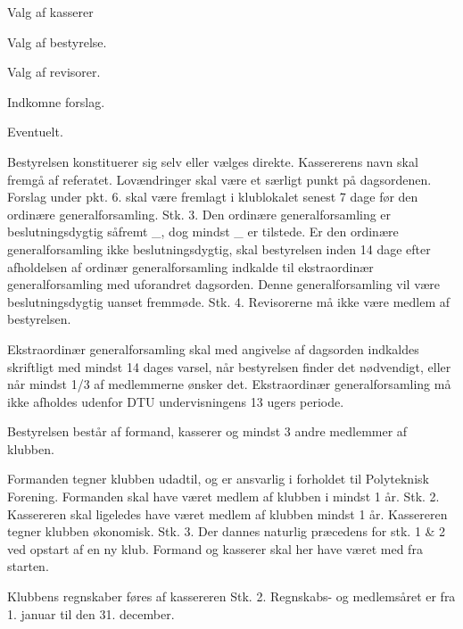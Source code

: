 \begin{list}
\begin{list}{•}
\item  Valg af kasserer
\item Valg af bestyrelse.
\item Valg af revisorer.
\item Indkomne forslag.
\item Eventuelt.
\end{list}
Bestyrelsen konstituerer sig selv eller vælges direkte. Kassererens navn skal fremgå af referatet. Lovændringer
skal være et særligt punkt på dagsordenen. Forslag under pkt. 6. skal være fremlagt i klublokalet senest 7 dage
før den ordinære generalforsamling.
Stk. 3. Den ordinære generalforsamling er beslutningsdygtig såfremt \_, 
dog mindst \_ er tilstede. Er
den ordinære generalforsamling ikke beslutningsdygtig, skal bestyrelsen inden 14 dage efter afholdelsen af
ordinær generalforsamling indkalde til ekstraordinær generalforsamling med uforandret dagsorden. Denne
generalforsamling vil være beslutningsdygtig uanset fremmøde.
Stk. 4. Revisorerne må ikke være medlem af bestyrelsen.
\item Ekstraordinær generalforsamling skal med angivelse af dagsorden indkaldes skriftligt med mindst 14 dages
varsel, når bestyrelsen finder det nødvendigt, eller når mindst 1/3 af medlemmerne ønsker det. Ekstraordinær
generalforsamling må ikke afholdes udenfor DTU undervisningens 13 ugers periode.
\item Bestyrelsen består af formand, kasserer og mindst 3 andre medlemmer af klubben.
\item Formanden tegner klubben udadtil, og er ansvarlig i forholdet til Polyteknisk Forening. Formanden skal have
været medlem af klubben i mindst 1 år.
Stk. 2. Kassereren skal ligeledes have været medlem af klubben mindst 1 år. Kassereren tegner klubben
økonomisk.
Stk. 3. Der dannes naturlig præcedens for stk. 1 \& 2 ved opstart af en ny klub. Formand og kasserer skal her
have været med fra starten.
\item Klubbens regnskaber føres af kassereren
Stk. 2. Regnskabs- og medlemsåret er fra 1. januar til den 31. december.


\end{list}

